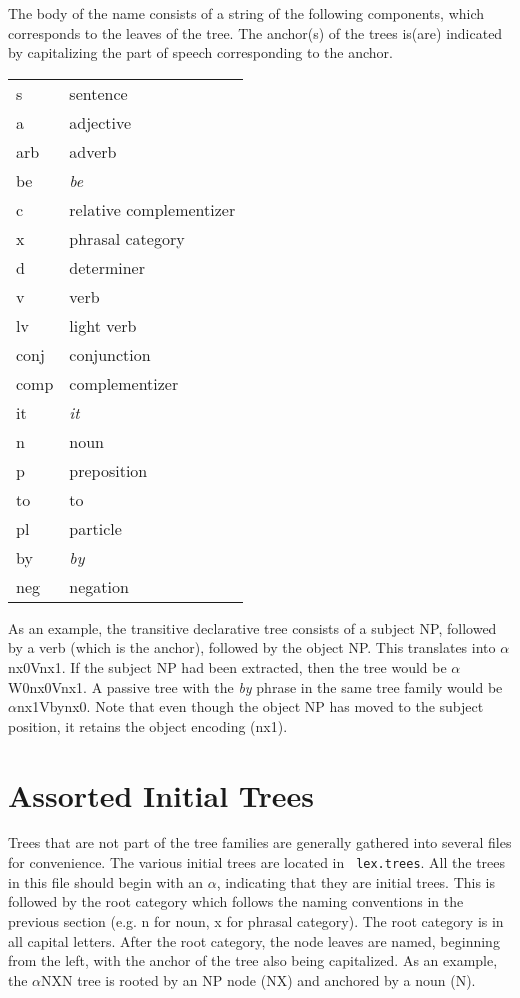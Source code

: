 \noindent The body of the name consists of a string of the following 
components, which corresponds to the leaves of the tree.  The anchor(s) of the
trees is(are) indicated by capitalizing the part of speech corresponding to the
anchor.

\begin{description}
\item\begin{tabular}{ll}
s&sentence\\
a&adjective\\
arb&adverb\\
be&{\it be}\\
c&relative complementizer\\
x&phrasal category\\
d&determiner\\
v&verb\\
lv&light verb\\
conj&conjunction\\
comp&complementizer\\
it&{\it it}\\
n&noun\\
p&preposition\\
to&to\\
pl&particle\\
by&{\it by}\\
neg&negation\\
\end{tabular}
\end{description}

\noindent As an example, the transitive declarative tree consists of a subject
NP, followed by a verb (which is the anchor), followed by the object NP.  This
translates into $\alpha$nx0Vnx1.  If the subject NP had been extracted, then
the tree would be $\alpha$W0nx0Vnx1.  A passive tree with the {\it by} phrase
in the same tree family would be $\alpha$nx1Vbynx0.  Note that even though the
object NP has moved to the subject position, it retains the object encoding
(nx1). 

\section{Assorted Initial Trees}

Trees that are not part of the tree families are generally gathered into
several files for convenience.  The various initial trees are located in {\tt
lex.trees}.  All the trees in this file should begin with an $\alpha$,
indicating that they are initial trees.  This is followed by the root category
which follows the naming conventions in the previous section (e.g. n for noun,
x for phrasal category).  The root category is in all capital letters.  After
the root category, the node leaves are named, beginning from the left, with the
anchor of the tree also being capitalized.  As an example, the $\alpha$NXN
tree is rooted by an NP node (NX) and anchored by a noun (N).

